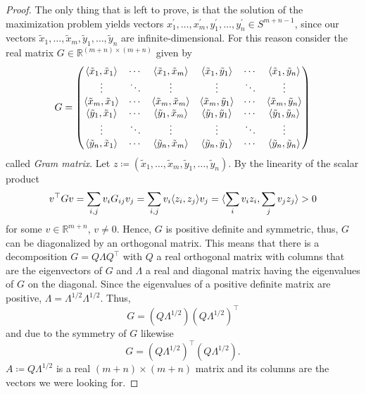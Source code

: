\begin{proof}
		The only thing that is left to prove, is that the solution of the maximization problem yields vectors $x_1^\prime,\dots,x_m^\prime, y_1^\prime,\dots,y_n^\prime\in S^{m+n-1}$, since our vectors $\tilde{x}_1,\dots,\tilde{x}_m,\tilde{y}_1,\dots,\tilde{y}_n$ are infinite-dimensional. 
		For this reason consider the real matrix $G\in\mathbb{R}^{(m+n)\times(m+n)}$ given by
		\begin{equation}
			G=\begin{pmatrix}
				\langle{\tilde{x}_1},{\tilde{x}_1}\rangle & \cdots & \langle{\tilde{x}_1},{\tilde{x}_m}\rangle& \langle{\tilde{x}_1},{\tilde{y}_1}\rangle & \cdots & \langle{\tilde{x}_1},{\tilde{y}_n}\rangle \\
				 \vdots		& \ddots	& \vdots & \vdots & \ddots & \vdots\\
				 \langle{\tilde{x}_m},{\tilde{x}_1}\rangle & \cdots & \langle{\tilde{x}_m},{\tilde{x}_m}\rangle& \langle{\tilde{x}_m},{\tilde{y}_1}\rangle & \cdots & \langle{\tilde{x}_m},{\tilde{y}_n}\rangle \\
				\langle{\tilde{y}_1},{\tilde{x}_1}\rangle & \cdots & \langle{\tilde{y}_1},{\tilde{x}_m}\rangle& \langle{\tilde{y}_1},{\tilde{y}_1}\rangle & \cdots & \langle{\tilde{y}_1},{\tilde{y}_n}\rangle \\
				 \vdots		& \ddots	& \vdots& \vdots & \ddots & \vdots\\
				 \langle{\tilde{y}_n},{\tilde{x}_1}\rangle & \cdots & \langle{\tilde{y}_n},{\tilde{x}_m}\rangle& \langle{\tilde{y}_n},{\tilde{y}_1}\rangle & \cdots & \langle{\tilde{y}_n},{\tilde{y}_n}\rangle 
			\end{pmatrix}
		\end{equation}
		called \emph{Gram matrix}. Let $z\coloneqq (\tilde{x}_1,\dots,\tilde{x}_m,\tilde{y}_1,\dots,\tilde{y}_n)$. By the linearity of the scalar product
		\begin{align*}
			v^\top G v = \sum_{i,j} v_i G_{ij} v_j 
			= \sum_{i,j} v_i \langle{z_i},{z_j}\rangle v_j 
			= \langle{\sum_i v_i z_i},{\sum_j v_j z_j}\rangle 
			> 0
		\end{align*}
		for some $v\in\mathbb{R}^{m+n}$, $v\neq 0$. Hence, $G$ is positive definite and symmetric, thus, $G$ can be diagonalized by an orthogonal matrix. This means that there is a decomposition $G=Q\Lambda Q^\top$ with $Q$ a real orthogonal matrix with columns that are the eigenvectors of $G$ and $\Lambda$ a real and diagonal matrix having the eigenvalues of $G$ on the diagonal. Since the eigenvalues of a positive definite matrix are positive, $\Lambda=\Lambda^{1/2}\Lambda^{1/2}$. Thus,
		\[
			G=(Q\Lambda^{1/2})(Q\Lambda^{1/2})^\top		
		\]
		and due to the symmetry of $G$ likewise
		\[
			G=(Q\Lambda^{1/2})^\top(Q\Lambda^{1/2}).	
		\]
		$A\coloneqq Q\Lambda^{1/2}$ is a real $(m+n)\times (m+n)$ matrix and its columns are the vectors we were looking for.
	\end{proof}
